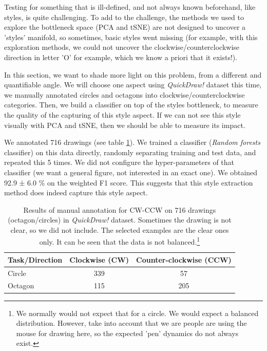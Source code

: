 \par Testing for something that is ill-defined, and not always known beforehand, like styles, is quite challenging. To add to the challenge, the methods we used to explore the bottleneck space (PCA and tSNE) are not designed to uncover a 'styles' manifold, so sometimes, basic styles went missing (for example, with this exploration methods, we could not uncover the clockwise/counterclockwise direction in letter 'O' for example, which we know a priori that it exists!).

\par In this section, we want to shade more light on this problem, from a different and quantifiable angle. We will choose one aspect using \textit{QuickDraw!} dataset this time, we manually annotated circles and octagons into clockwise/counterclockwise categories. Then, we build a classifier on top of the styles bottleneck, to measure the quality of the capturing of this style aspect. If we can not see this style visually with PCA and tSNE, then we should be able to measure its impact.

\par We annotated 716 drawings (see table \ref{table:cw_ccw_annotation}). We trained a classifier (\textit{Random forests} classifier) on this data directly, randomly separating training and test data, and repeated this 5 times. We did not configure the hyper-parameters of that classifier (we want a general figure, not interested in an exact one). We obtained 92.9 ± 6.0 \% on the weighted F1 score. This suggests that this style extraction method does indeed capture this style aspect.

\begin{table}[!htbp]
  \centering
  \begin{tabular}{l c c}
  \hline
  Task/Direction & Clockwise (CW) & Counter-clockwise (CCW)\\ \hline
  Circle &  339 & 57 \\ %
  Octagon & 115 & 205 \\ \hline
  \end{tabular}
  \caption{Results of manual annotation for CW-CCW on 716 drawings (octagon/circles) in \textit{QuickDraw!} dataset. Sometimes the drawing is not clear, so we did not include. The selected examples are the clear ones only. It can be seen that the data is not balanced.\footnote{We normally would not expect that for a circle. We would expect a balanced distribution. However, take into account that we are people are using the mouse for drawing here, so the expected 'pen' dynamics do not always exist.}}
  \label{table:cw_ccw_annotation}
\end{table}


